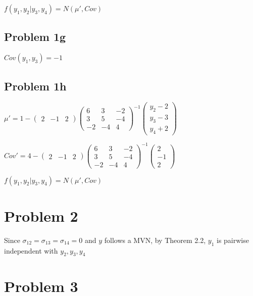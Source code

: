 \documentclass[a4paper]{article}
\begin{document}
 $f(y_1, y_2 |y_3, y_4) = N(\mu', Cov)$

\subsection*{Problem 1g}
$Cov(y_1,y_3) = -1 $

\subsection*{Problem 1h}

$\mu' = 1 - \begin{pmatrix} 2 & -1 & 2 \end{pmatrix} \begin{pmatrix} 6 & 3 & -2\\ 3 & 5 & -4 \\ -2 & -4 & 4 \end{pmatrix}^{-1} \begin{pmatrix} y_2-2\\ y_3-3\\ y_4+2 \end{pmatrix} $

$Cov' = 4 - \begin{pmatrix} 2 & -1 & 2 \end{pmatrix} \begin{pmatrix} 6 & 3 & -2\\ 3 & 5 & -4 \\ -2 & -4 & 4 \end{pmatrix}^{-1} \begin{pmatrix} 2 \\ -1 \\ 2 \end{pmatrix}$

 $f(y_1, y_2 |y_3, y_4) = N(\mu', Cov)$






\section*{Problem 2}
Since $\sigma_{12} = \sigma_{13} = \sigma_{14} = 0$ and $y$ follows a MVN, by Theorem 2.2, $y_1$ is pairwise independent with $y_2,y_3,y_4$

\section*{Problem 3}
\end{document}
